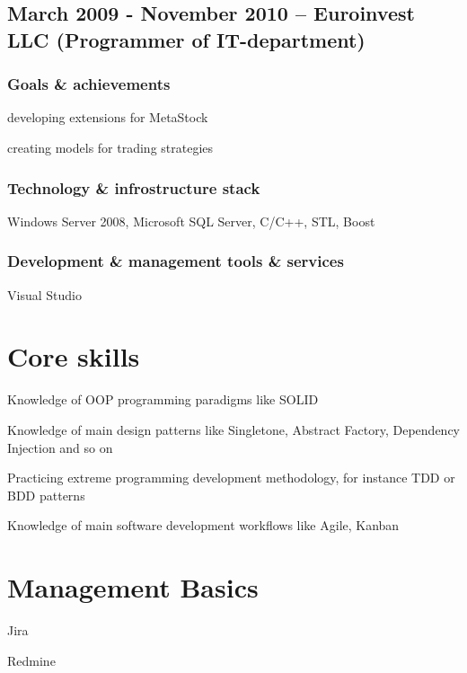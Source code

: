 \documentclass[9pt, a4paper, english]{extarticle}
\begin{document}
  \subsection* {March 2009 - November 2010 -- \textbf{Euroinvest LLC} (Programmer of IT-department)}
    \subsubsection* {Goals \& achievements}
      \begin {list}{\textbullet}{\itemsep=0mm}
        \item developing extensions for MetaStock
        \item creating models for trading strategies
      \end {list}
    \subsubsection* {Technology \& infrostructure stack}
      Windows Server 2008, Microsoft SQL Server, C/C++, STL, Boost
    \subsubsection* {Development \& management tools \& services}
      Visual Studio

\section* {Core skills}
  \begin {list}{\textbullet}{\itemsep=0mm}
    \item Knowledge of OOP programming paradigms like SOLID
    \item Knowledge of main design patterns like Singletone, Abstract Factory,
      Dependency Injection and so on
    \item Practicing extreme programming development methodology, for instance
      TDD or BDD patterns 
    \item Knowledge of main software development workflows like Agile, Kanban
  \end{list}

\pagebreak

\section* {Management Basics}
  \begin{multicols}{2}
    \begin {list}{\textbullet}{\itemsep=0mm}
      \item Jira
        \columnbreak
      \item Redmine
    \end{list}
  \end{multicols}
\end{document}
